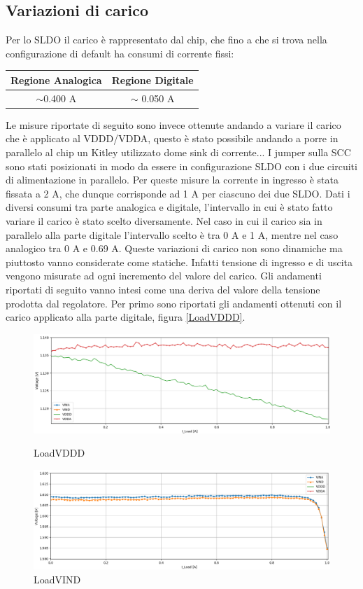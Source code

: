 \subsection{Variazioni di carico}
Per lo SLDO il carico è rappresentato dal chip, che fino a che si trova nella configurazione di default ha consumi di corrente fissi:
\begin{center}
\begin{tabular}{cc }
\hline
Regione Analogica & Regione Digitale \\ \hline
$\sim$0.400 A & $\sim$ 0.050 A\\ \hline     
\end{tabular}
\end{center}
Le misure riportate di seguito sono invece ottenute andando a variare il carico che è applicato al VDDD/VDDA, questo è stato possibile andando a porre in parallelo al chip un Kitley utilizzato dome sink di corrente... I jumper sulla SCC sono stati posizionati in modo da essere in configurazione SLDO con i due circuiti di alimentazione in parallelo. 
Per queste misure la corrente in ingresso è stata fissata a 2 A, che dunque corrisponde ad 1 A per ciascuno dei due SLDO. 
Dati i diversi consumi tra parte analogica e digitale, l'intervallo in cui è stato fatto variare il carico è stato scelto diversamente. Nel caso in cui il carico sia in parallelo alla parte digitale l'intervallo scelto è tra 0 A e 1 A, mentre nel caso analogico tra 0 A e 0.69 A. 
Queste variazioni di carico non sono dinamiche ma piuttosto vanno considerate come statiche. Infatti tensione di ingresso e di uscita vengono misurate ad ogni incremento del valore del carico. 
Gli andamenti riportati di seguito vanno intesi come una deriva del valore della tensione prodotta dal regolatore. 
Per primo sono riportati gli andamenti ottenuti con il carico applicato alla parte digitale, figura \ref{LoadVDDD}. 
\begin{figure}
\centering
\includegraphics[scale=.3]{Immagini/LoadVDDD}
\caption{LoadVDDD}
\label{LoadVDDD}
\includegraphics[scale=.3]{Immagini/LoadVIND}
\caption{LoadVIND}
\label{LoadVIND}
\end{figure}
